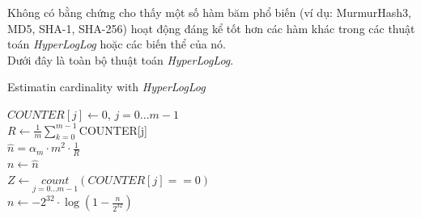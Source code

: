 \documentclass[a4paper,13pt]{article}
\theoremstyle{mytheor}
\begin{document}
\indent Không có bằng chứng cho thấy một số hàm băm phổ biến (ví dụ: MurmurHash3, MD5, SHA-1, SHA-256) 
hoạt động đáng kể tốt hơn các hàm khác trong các thuật toán \textit{HyperLogLog} hoặc các biến thể của nó.\\
\indent Dưới đây là toàn bộ thuật toán \textit{HyperLogLog}.\\
\begin{algorithm}[H]
    \vspace{0.25cm}
    \DontPrintSemicolon
    \LinesNumberedHidden
    \caption[]{Estimatin cardinality with \textit{HyperLogLog}}
    $COUNTER[j] \gets $0, $j = 0...m - 1$\\
    $R \gets \frac{1}{m} \sum\limits_{k=0}^{m-1}$COUNTER[j] \\
    $\hat{n} = \alpha_m \cdot m^2 \cdot \frac{1}{R}$ \\
    $n \gets \hat{n}$ \\
    {
        $Z \gets \underset{j=0...m-1}{count}\left(COUNTER[j] == 0\right)$\\
    }
    {
        $n \gets -2^{32}\cdot\log\left(1-\frac{n}{2^{32}}\right)$
    }
    \vspace{0.25cm}
\end{algorithm}
\vspace{0.25cm}
\end{document}
